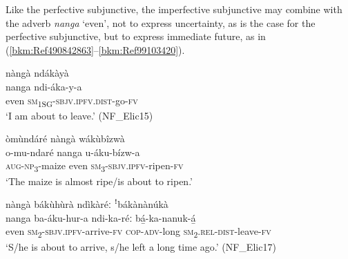 Like the perfective subjunctive, the imperfective subjunctive may combine with the adverb \textit{nanga} ‘even’, not to express uncertainty, as is the case for the perfective subjunctive, but to express immediate future, as in (\ref{bkm:Ref490842863}--\ref{bkm:Ref99103420}).

\ea
\label{bkm:Ref490842863}
nàngà ndákàyà\\
\gll nanga  ndi-áka-y-a\\
even  \textsc{sm}\textsubscript{1SG}-\textsc{sbjv}.\textsc{ipfv}.\textsc{dist}-go-\textsc{fv}\\
\glt ‘I am about to leave.’ (NF\_Elic15)
\z

\ea
òmùndáré nàngà wákùbîzwà\\
\gll o-mu-ndaré    nanga  u-áku-bízw-a\\
\textsc{aug}-\textsc{np}\textsubscript{3}-maize  even  \textsc{sm}\textsubscript{3}-\textsc{sbjv}.\textsc{ipfv}-ripen-\textsc{fv}\\
\glt ‘The maize is almost ripe/is about to ripen.’
\z

\ea
\label{bkm:Ref99103420}
nàngà bákùhùrà ndìkàréː ꜝbákànànúkà\\
\gll nanga  ba-áku-hur-a    ndi-ka-réː    bá̲-ka-nanuk-á̲\\
even  \textsc{sm}\textsubscript{2}-\textsc{sbjv}.\textsc{ipfv}-arrive-\textsc{fv}  \textsc{cop}-\textsc{adv}-long  \textsc{sm}\textsubscript{2}.\textsc{rel}-\textsc{dist}-leave-\textsc{fv}\\
\glt ‘S/he is about to arrive, s/he left a long time ago.’ (NF\_Elic17)
\z


